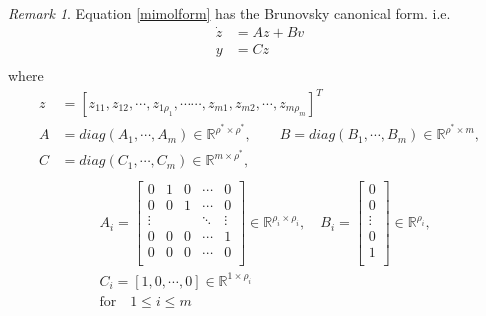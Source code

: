 \documentclass[11pt, a4paper, oneside, openany, reqno]{book}
\theoremstyle{definition}
\theoremstyle{remark}
\newtheorem{remark}[theorem]{Remark}
\numberwithin{equation}{chapter} %
\newcommand{\R}{\ensuremath{{\mathbb R}}}
\begin{document}
\begin{remark} 
	Equation \eqref{mimolform} has the Brunovsky canonical form. i.e.
	\begin{equation}\begin{split}
	\dot{z}&=Az+Bv \\
	y&= Cz\\
	\end{split}\end{equation} 
	where 
	\begin{equation}\begin{split}\label{brunovsky}
	z&=\left[z_{11},z_{12},\cdots,z_{1\rho_1},\cdots\cdots, z_{m1}, z_{m2}, \cdots, z_{m\rho_m} \right] ^T \\ 
	A&=diag(A_1, \cdots , A_m) \in \R^{\rho^* \times \rho^*},
	\qquad B=diag(B_1,\cdots,B_m) \in \R^{\rho^* \times m}, \\
	C&=diag(C_1, \cdots , C_m) \in \R^{m \times \rho^*},\\
	\end{split}\end{equation} 
	\begin{equation*}\begin{split}
	& A_i= \left[ \begin{array}{ccccc}
	0 & 1 & 0 & \cdots & 0\\
	0 & 0 & 1 & \cdots & 0\\
	\vdots & & & \ddots & \vdots \\
	0 & 0 & 0 & \cdots & 1 \\
	0 & 0 & 0 & \cdots & 0 \\
	\end{array} \right]  \in \R^{\rho_i \times \rho_i}, \quad
	B_i = \left[\begin{array}{c}0 \\ 0 \\ \vdots \\ 0  \\ 1  \\ \end{array} \right]  \in \R^{\rho_i} ,\\
	& C_i=\left[ 1, 0, \cdots, 0 \right] \in \R^{1 \times \rho_i} \\
	& \mathrm{for} \quad 1 \leq i \leq m \\
	\end{split}\end{equation*} 
\end{remark}

\end{document}
